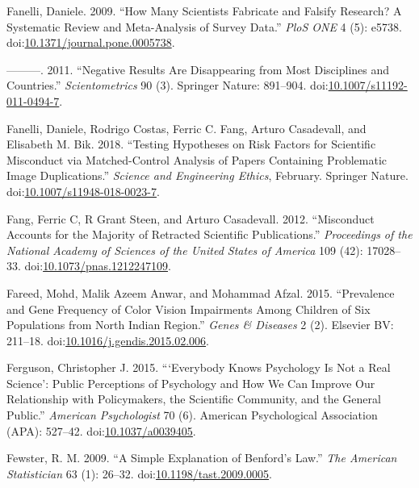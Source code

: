 \documentclass[a5paper]{book}
\begin{document}
\hypertarget{ref-doi:10.1371ux2fjournal.pone.0005738}{}
Fanelli, Daniele. 2009. ``How Many Scientists Fabricate and Falsify
Research? A Systematic Review and Meta-Analysis of Survey Data.''
\emph{PloS ONE} 4 (5): e5738.
doi:\href{https://doi.org/10.1371/journal.pone.0005738}{10.1371/journal.pone.0005738}.

\hypertarget{ref-doi:10.1007ux2fs11192-011-0494-7}{}
---------. 2011. ``Negative Results Are Disappearing from Most
Disciplines and Countries.'' \emph{Scientometrics} 90 (3). Springer
Nature: 891--904.
doi:\href{https://doi.org/10.1007/s11192-011-0494-7}{10.1007/s11192-011-0494-7}.

\hypertarget{ref-doi:10.1007ux2fs11948-018-0023-7}{}
Fanelli, Daniele, Rodrigo Costas, Ferric C. Fang, Arturo Casadevall, and
Elisabeth M. Bik. 2018. ``Testing Hypotheses on Risk Factors for
Scientific Misconduct via Matched-Control Analysis of Papers Containing
Problematic Image Duplications.'' \emph{Science and Engineering Ethics},
February. Springer Nature.
doi:\href{https://doi.org/10.1007/s11948-018-0023-7}{10.1007/s11948-018-0023-7}.

\hypertarget{ref-doi:10.1073ux2fpnas.1212247109}{}
Fang, Ferric C, R Grant Steen, and Arturo Casadevall. 2012. ``Misconduct
Accounts for the Majority of Retracted Scientific Publications.''
\emph{Proceedings of the National Academy of Sciences of the United
States of America} 109 (42): 17028--33.
doi:\href{https://doi.org/10.1073/pnas.1212247109}{10.1073/pnas.1212247109}.

\hypertarget{ref-doi:10.1016ux2fj.gendis.2015.02.006}{}
Fareed, Mohd, Malik Azeem Anwar, and Mohammad Afzal. 2015. ``Prevalence
and Gene Frequency of Color Vision Impairments Among Children of Six
Populations from North Indian Region.'' \emph{Genes \& Diseases} 2 (2).
Elsevier BV: 211--18.
doi:\href{https://doi.org/10.1016/j.gendis.2015.02.006}{10.1016/j.gendis.2015.02.006}.

\hypertarget{ref-doi:10.1037ux2fa0039405}{}
Ferguson, Christopher J. 2015. ```Everybody Knows Psychology Is Not a
Real Science': Public Perceptions of Psychology and How We Can Improve
Our Relationship with Policymakers, the Scientific Community, and the
General Public.'' \emph{American Psychologist} 70 (6). American
Psychological Association (APA): 527--42.
doi:\href{https://doi.org/10.1037/a0039405}{10.1037/a0039405}.

\hypertarget{ref-doi:10.1198ux2ftast.2009.0005}{}
Fewster, R. M. 2009. ``A Simple Explanation of Benford's Law.''
\emph{The American Statistician} 63 (1): 26--32.
doi:\href{https://doi.org/10.1198/tast.2009.0005}{10.1198/tast.2009.0005}.
\end{document}
